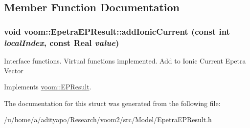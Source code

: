 \subsection{Member Function Documentation}
\hypertarget{structvoom_1_1_epetra_e_p_result_a3df34f3a42a943943577e7dce50d1036}{
\subsubsection[{addIonicCurrent}]{\setlength{\rightskip}{0pt plus 5cm}void voom::EpetraEPResult::addIonicCurrent (const int {\em localIndex}, \/  const Real {\em value})}}
\label{structvoom_1_1_epetra_e_p_result_a3df34f3a42a943943577e7dce50d1036}
Interface functions. Virtual functions implemented. Add to Ionic Current Epetra Vector 

Implements \hyperlink{structvoom_1_1_e_p_result}{voom::EPResult}.

The documentation for this struct was generated from the following file:\begin{DoxyCompactItemize}
\item 
/u/home/a/adityapo/Research/voom2/src/Model/EpetraEPResult.h\end{DoxyCompactItemize}
